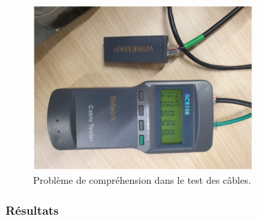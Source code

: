 \documentclass[a4paper]{article}
\begin{document}
\begin{center}
  \begin{figure}[H]
    \centering
    \includegraphics[width=0.75\textwidth]{erreur-cables1.PNG}
    \caption{Problème de compréhension dans le test des câbles.}
    \label{fig:erreurCable1}
  \end{figure}
\end{center}










\subsubsection{Résultats}
\end{document}
